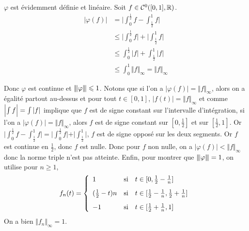 \begin{solution}
	$\varphi$ est évidemment définie et linéaire. Soit $f\in\mathcal{C}^{0}([0,1],\mathbb{R})$.
	\begin{align*}
		\vert\varphi(f)\vert
		&=\Biggl\vert\int_{0}^{\frac{1}{2}}f-\int_{\frac{1}{2}}^{1}f\Biggr\vert\\
		&\leqslant\Biggl\vert\int_{0}^{\frac{1}{2}}f\Biggr\vert+\Biggl\vert\int_{\frac{1}{2}}^{1}f\Biggr\vert\\
		&\leqslant\int_{0}^{\frac{1}{2}}\vert f\vert+\int_{\frac{1}{2}}^{1}\vert f\vert\\
		&\leqslant\int_{0}^{1}\Vert f\Vert_{\infty}=\Vert f\Vert_{\infty}
	\end{align*}
\end{solution}

Donc $\varphi$ est continue et ${\left\vert\kern-0.25ex\left\vert\kern-0.25ex\left\vert{}\varphi \right\vert\kern-0.25ex\right\vert\kern-0.25ex\right\vert}\leqslant1$. Notons que si l'on a $\vert\varphi(f)\vert=\Vert f\Vert_{\infty}$, alors on a égalité partout au-dessus et pour tout $t\in[0,1]$, $\vert f(t)\vert=\Vert f\Vert_{\infty}$ et comme $\Bigl\vert\int f\Bigr\vert=\int\vert f\vert$ implique que $f$ est de signe constant sur l'intervalle d'intégration, si l'on a $\vert\varphi(f)\vert=\Vert f\Vert_{\infty}$, alors $f$ est de signe constant sur $[0,\frac{1}{2}]$ et sur $[\frac{1}{2},1]$.  Or $\vert\int_{0}^{\frac{1}{2}}f-\int_{\frac{1}{2}}^{1}f\vert=\vert\int_{0}^{\frac{1}{2}}f\vert+\vert\int_{\frac{1}{2}}^{1}\vert$, $f$ est de signe opposé sur les deux segments. Or $f$ est continue en $\frac{1}{2}$, donc $f$ est nulle. Donc pour $f$ non nulle, on a $\vert\varphi(f)\vert<\Vert f\Vert_{\infty}$ donc la norme triple n'est pas atteinte. Enfin, pour montrer que ${\left\vert\kern-0.25ex\left\vert\kern-0.25ex\left\vert{}\varphi \right\vert\kern-0.25ex\right\vert\kern-0.25ex\right\vert}=1$, on utilise pour $n\geqslant1$,
$$
f_{n}(t)=
\left\{
	\begin{array}[]{lll}
		1 & \text{si} & t\in[0,\frac{1}{2}-\frac{1}{n}]\\[0.3cm]
		(\frac{1}{2}-t)n & \text{si} & t\in[\frac{1}{2}-\frac{1}{n},\frac{1}{2}+\frac{1}{n}]\\[0.3cm]
		-1 & \text{si} & t\in[\frac{1}{2}+\frac{1}{n},1]
	\end{array}
\right.
$$
On a bien $\Vert f_{n}\Vert_{\infty}=1$.

